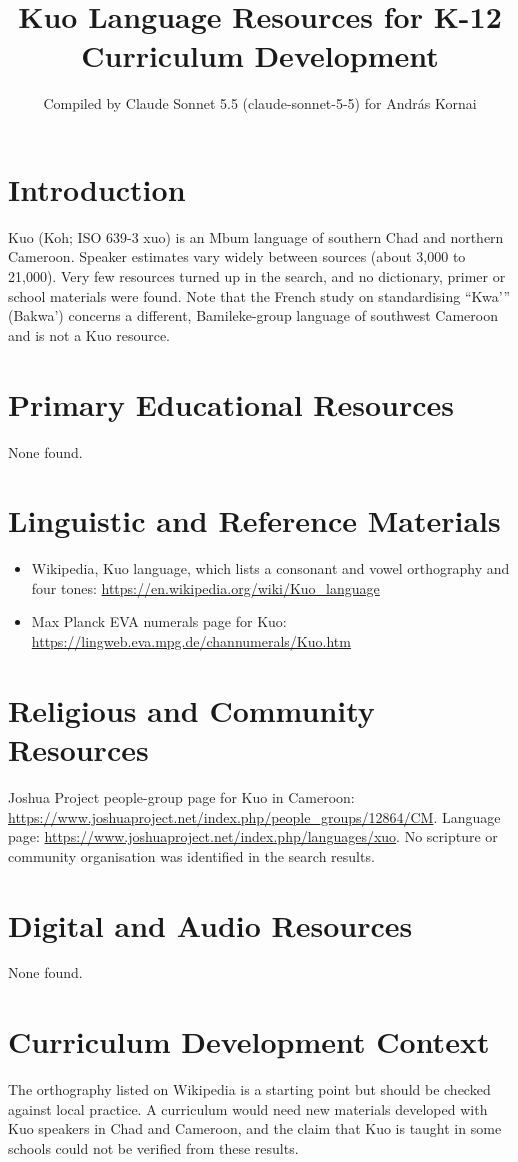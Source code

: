 \documentclass[12pt]{article}
\title{Kuo Language Resources for K-12 Curriculum Development}
\author{Compiled by Claude Sonnet 5.5 (claude-sonnet-5-5) for Andr\'as Kornai}
\date{}
\begin{document}
\maketitle
\section{Introduction}
Kuo (Koh; ISO 639-3 xuo) is an Mbum language of southern Chad and northern Cameroon. Speaker estimates vary widely between sources (about 3,000 to 21,000). Very few resources turned up in the search, and no dictionary, primer or school materials were found. Note that the French study on standardising ``Kwa'{}'' (Bakwa') concerns a different, Bamileke-group language of southwest Cameroon and is not a Kuo resource.
\section{Primary Educational Resources}
None found.
\section{Linguistic and Reference Materials}
\begin{itemize}
\item Wikipedia, Kuo language, which lists a consonant and vowel orthography and four tones: \url{https://en.wikipedia.org/wiki/Kuo_language}
\item Max Planck EVA numerals page for Kuo: \url{https://lingweb.eva.mpg.de/channumerals/Kuo.htm}
\end{itemize}
\section{Religious and Community Resources}
Joshua Project people-group page for Kuo in Cameroon: \url{https://www.joshuaproject.net/index.php/people_groups/12864/CM}. Language page: \url{https://www.joshuaproject.net/index.php/languages/xuo}. No scripture or community organisation was identified in the search results.
\section{Digital and Audio Resources}
None found.
\section{Curriculum Development Context}
The orthography listed on Wikipedia is a starting point but should be checked against local practice. A curriculum would need new materials developed with Kuo speakers in Chad and Cameroon, and the claim that Kuo is taught in some schools could not be verified from these results.
\end{document}
